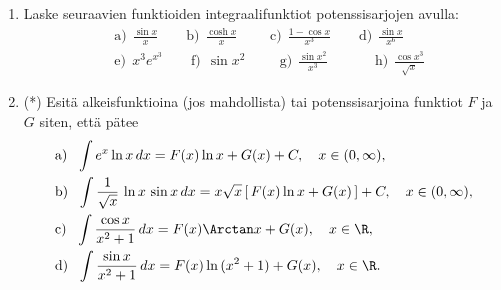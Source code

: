 \begin{enumerate}
\item
Laske seuraavien funktioiden integraalifunktiot potenssisarjojen avulla:
\begin{align*}
&\text{a)}\ \ \frac{\sin x}{x} \qquad
 \text{b)}\ \ \frac{\cosh x}{x} \qquad\,\,
 \text{c)}\ \ \frac{1-\cos x}{x^3} \qquad
 \text{d)}\ \ \frac{\sin x}{x^6} \\
&\text{e)}\ \ x^3 e^{x^3} \qquad
 \text{f)}\ \ \sin x^2 \qquad\ \
 \text{g)}\ \ \frac{\sin x^2}{x^3} \qquad\quad\,\
 \text{h)}\ \ \frac{\cos x^3}{\sqrt{x}}
\end{align*}

\item (*)
Esitä alkeisfunktioina (jos mahdollista) tai potenssisarjoina funktiot $F$ ja $G$ siten,
että pätee
\begin{align*}
&\text{a)}\ \ \int e^x\ln x\,dx = F(x)\ln x + G(x)+C, \quad x\in(0,\infty), \\
&\text{b)}\ \ \int \frac{1}{\sqrt{x}}\,\ln x\,\sin x\,dx
                   = x\sqrt{x}\,[\,F(x)\ln x + G(x)\,]+C, \quad x\in(0,\infty), \\
&\text{c)}\ \ \int \frac{\cos x}{x^2+1}\,dx = F(x)\Arctan x+G(x), \quad x\in\R, \\
&\text{d)}\ \ \int \frac{\sin x}{x^2+1}\,dx = F(x)\ln\,(x^2+1)+G(x), \quad x\in\R.
\end{align*}


\end{enumerate}

